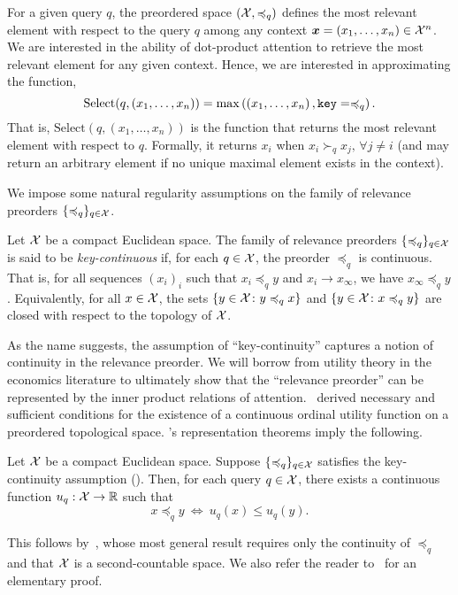 For a given query $q$, the preordered space $({\mathcal{X}}, \preccurlyeq_q)$ defines the most relevant element with respect to the query $q$ among any context $\bm{x} = (x_1, \ldots, x_n) \in {\mathcal{X}}^n$. We are interested in the ability of dot-product attention to retrieve the most relevant element for any given context. Hence, we are interested in approximating the function,
\begin{equation}\label{eq:def_select}
    \mathrm{Select}(q, (x_1, \ldots, x_n)) = \max\paren{\paren{x_1, \ldots, x_n}, \mathtt{key}=\preceq_q}.
\end{equation}
That is, $\mathrm{Select}(q, (x_1, \ldots, x_n))$ is the function that returns the most relevant element with respect to $q$. Formally, it returns $x_i$ when $x_i \succ_q x_j, \, \forall j \neq i$ (and may return an arbitrary element if no unique maximal element exists in the context).

We impose some natural regularity assumptions on the family of relevance preorders $\{\preccurlyeq_q\}_{q \in {\mathcal{X}}}$.
\begin{assumption}\label{ass:key_cts}
    Let ${\mathcal{X}}$ be a compact Euclidean space. The family of relevance preorders $\{\preccurlyeq_q\}_{q \in {\mathcal{X}}}$ is said to be \textit{key-continuous} if, for each $q \in {\mathcal{X}}$, the preorder $\preceq_q$ is continuous. That is, for all sequences $(x_i)_i$ such that $x_i \preceq_q y$ and $x_i \to x_\infty$, we have $x_\infty \preceq_q y$. Equivalently, for all $x \in {\mathcal{X}}$, the sets $\{y \in {\mathcal{X}} \colon y \preccurlyeq_q x\}$ and $\{y \in {\mathcal{X}} \colon x \preccurlyeq_q y\}$ are closed with respect to the topology of ${\mathcal{X}}$.
\end{assumption}

As the name suggests, the assumption of ``key-continuity'' captures a notion of continuity in the relevance preorder. We will borrow from utility theory in the economics literature to ultimately show that the ``relevance preorder'' can be represented by the inner product relations of attention.~\citet{debreuRepresentationPreferenceOrdering1954} derived necessary and sufficient conditions for the existence of a continuous ordinal utility function on a preordered topological space. 's representation theorems imply the following.

\begin{theorem*}
    Let ${\mathcal{X}}$ be a compact Euclidean space. Suppose $\{\preccurlyeq_q\}_{q \in {\mathcal{X}}}$ satisfies the key-continuity assumption (). Then, for each query $q \in {\mathcal{X}}$, there exists a continuous function $u_q: {\mathcal{X}} \to \mathbb{R}$ such that
    \begin{equation*}
        x \preceq_q y \ \iff \ u_q(x) \leq u_q(y).
    \end{equation*}
\end{theorem*}
This follows by~\parencite{debreuRepresentationPreferenceOrdering1954}, whose most general result requires only the continuity of $\preceq_q$ and that ${\mathcal{X}}$ is a second-countable space. We also refer the reader to~\parencite{jaffrayExistenceContinuousUtility1975} for an elementary proof.


